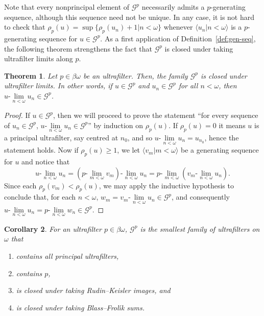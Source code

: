 \documentclass[10pt]{amsart}
\newcommand{\ulim}[2]{#1\text{-}\lim\limits_{#2<\omega}}
\newtheorem{theorem}{Theorem}[section]
\newtheorem{corollary}[theorem]{Corollary}
\theoremstyle{definition}
\theoremstyle{remark}
\begin{document}
Note that every nonprincipal element of $\mathscr G^p$ necessarily admits a $p$-generating sequence, although this sequence need not be unique. In any case, it is not hard to check that $\rho_p(u)=\sup\{\rho_p(u_n)+1\big|n<\omega\}$ whenever $\langle u_n\big|n<\omega\rangle$ is a $p$-generating sequence for $u\in\mathscr G^p$. As a first application of Definition~\ref{def:gen-seq}, the following theorem strengthens the fact that $\mathscr G^p$ is closed under taking ultrafilter limits along $p$.

\begin{theorem}\label{thm:closedunderlimits}
    Let $p\in\beta\omega$ be an ultrafilter. Then, the family $\mathscr G^p$ is closed under ultrafilter limits. In other words, if $u\in\mathscr G^p$ and $u_n\in\mathscr G^p$ for all $n<\omega$, then $\ulim{u}{n}u_n\in\mathscr G^p$.
\end{theorem}

\begin{proof}
    If $u\in\mathscr G^p$, then we will proceed to prove the statement ``for every sequence of $u_n\in\mathscr G^p$, $\ulim{u}{n}u_n\in\mathscr G^p$'' by induction on $\rho_p(u)$. If $\rho_p(u)=0$ it means $u$ is a principal ultrafilter, say centred at $n_0$, and so $\ulim{u}{n}u_n=u_{n_0}$, hence the statement holds. Now if $\rho_p(u)\geq 1$, we let $\langle v_m\big|m<\omega\rangle$ be a generating sequence for $u$ and notice that 
    \begin{equation*}
    \ulim{u}{n}u_n=\ulim{\left(\ulim{p}{m}v_m\right)}{n} u_n=\ulim{p}{m}\left(\ulim{v_m}{n} u_n\right).
    \end{equation*}
    Since each $\rho_p(v_m)<\rho_p(u)$, we may apply the inductive hypothesis to conclude that, for each $n<\omega$, $w_m=\ulim{v_m}{n} u_n\in\mathscr G^p$, and consequently $\ulim{u}{n}u_n=\ulim{p}{n}w_n\in\mathscr G^p$.
\end{proof}

\begin{corollary}\label{cor:characterizationofg}
    For an ultrafilter $p\in\beta\omega$, $\mathscr G^p$ is the smallest family of ultrafilters on $\omega$ that
    \begin{enumerate}
        \item contains all principal ultrafilters,
        \item contains $p$,
        \item is closed under taking Rudin--Keisler images, and
        \item is closed under taking Blass--Frol\'{\i}k sums.
    \end{enumerate}
\end{corollary}
\end{document}

